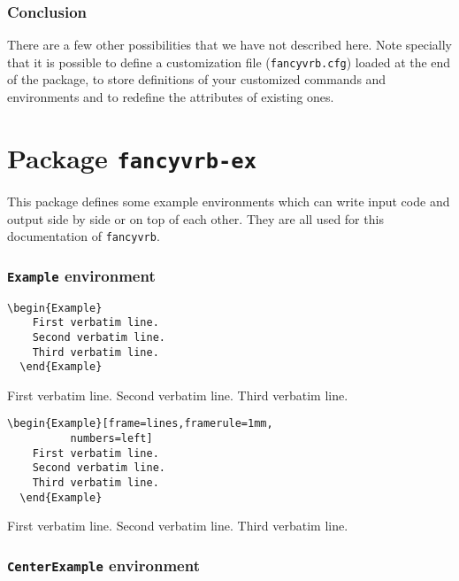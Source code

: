 \documentclass[twoside]{article}
\begin{document}
\begin{changebar}
\fi
\section{Conclusion}

  There are a few other possibilities that we have not described here.
Note specially that it is possible to define a customization file
(\texttt{fancyvrb.cfg}) loaded at the end of the package, to store
definitions of your customized commands and environments and to redefine
the attributes of existing ones.


\clearpage


\part{Package \texttt{fancyvrb-ex}}
This package defines some example environments which can write input code
and output side by side or on top of each other. They are all used for this documentation of \texttt{fancyvrb}.

\section{\texttt{Example} environment}

\begin{Verbatim}[gobble=2]
  \begin{Example}
    First verbatim line.
    Second verbatim line.
    Third verbatim line.
  \end{Example}
\end{Verbatim}

\begin{Example}
  First verbatim line.
  Second verbatim line.
  Third verbatim line.
\end{Example}

\begin{Verbatim}[gobble=2]
  \begin{Example}[frame=lines,framerule=1mm,
          numbers=left]
    First verbatim line.
    Second verbatim line.
    Third verbatim line.
  \end{Example}
\end{Verbatim}

\begin{Example}[frame=lines,framerule=1mm,numbers=left]
  First verbatim line.
  Second verbatim line.
  Third verbatim line.
\end{Example}

\newpage

\section{\texttt{CenterExample} environment}


\end{changebar}
\end{document}
